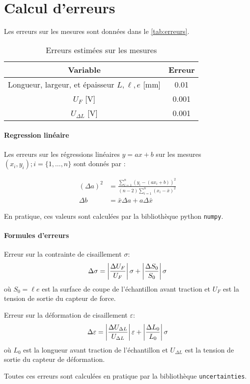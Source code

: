 \section{Calcul d'erreurs}
\label{sec:erreurs}

Les erreurs sur les mesures sont données dans le \autoref{tab:erreurs}.

\begin{table}[h]
    \centering
    \begin{tabulary}{\textwidth}{C C}
        \toprule
        Variable & Erreur \\
        \midrule
        Longueur, largeur, et épaisseur \(L, \ell, e\) [\si{\milli\meter}] & 0.01 \\
        \(U_F\) [\si{\volt}] & 0.001 \\
        \(U_{\Delta L}\) [\si{\volt}] & 0.001 \\
        \bottomrule
    \end{tabulary}
    \caption{Erreurs estimées sur les mesures}
    \label{tab:erreurs}
\end{table}

\paragraph*{Regression linéaire}
Les erreurs sur les régressions linéaires \(y = ax + b\) sur les mesures \((x_i, y_i) ; i = \{1, \dots, n\}\) sont donnés par \cite{erreursmesure}:

\begin{equation}
    \label{eq:erreur:fit}
    \begin{aligned}
        (\Delta a)^2 &= \frac{\sum_{i=1}^{n}(y_i - (a x_i + b))^2}{(n-2) \sum_{i=1}^{n}(x_i - \bar{x})^2}\\
        \Delta b &= \bar{x} \Delta a + a \Delta \bar{x}
    \end{aligned}
\end{equation}

En pratique, ces valeurs sont calculées par la bibliothèque python \texttt{numpy}.

\paragraph*{Formules d'erreurs}

Erreur sur la contrainte de cisaillement \(\sigma\):
\begin{equation}
    \Delta \sigma = \left|\frac{\Delta U_F}{U_F}\right| \sigma + \left|\frac{\Delta S_0}{S_0}\right| \sigma
\end{equation}
où \(S_0 = \ell e\) est la surface de coupe de l'échantillon avant traction et \(U_F\) est la tension de sortie du capteur de force.

Erreur sur la déformation de cisaillement \(\varepsilon\):
\begin{equation}
    \Delta \varepsilon = \left|\frac{\Delta U_{\Delta L}}{U_{\Delta L}}\right| \varepsilon + \left|\frac{\Delta L_0}{L_0}\right| \sigma
\end{equation}
où \(L_0\) est la longueur avant traction de l'échantillon et \(U_{\Delta L}\) est la tension de sortie du capteur de déformation.

Toutes ces erreurs sont calculées en pratique par la bibliothèque \texttt{uncertainties}.

